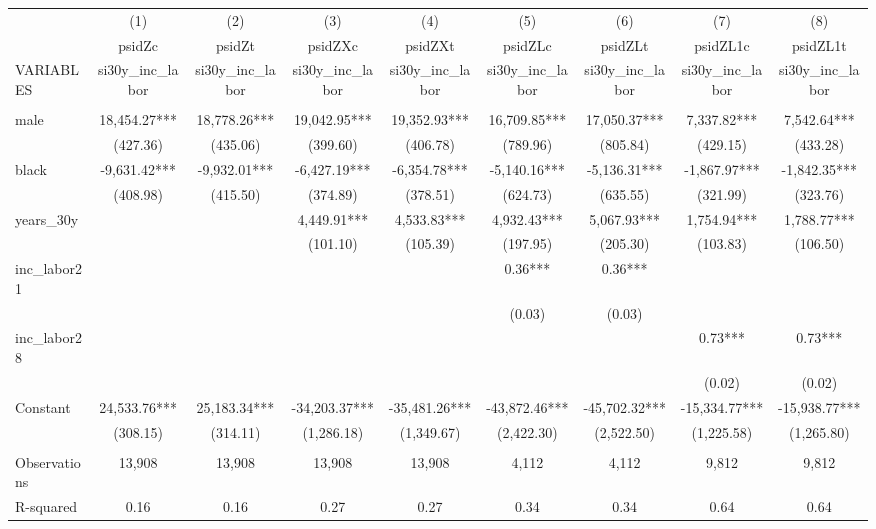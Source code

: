 \begin{tabular}{lcccccccc} \hline
 & (1) & (2) & (3) & (4) & (5) & (6) & (7) & (8) \\
 & psidZc & psidZt & psidZXc & psidZXt & psidZLc & psidZLt & psidZL1c & psidZL1t \\
VARIABLES & si30y\_inc\_labor & si30y\_inc\_labor & si30y\_inc\_labor & si30y\_inc\_labor & si30y\_inc\_labor & si30y\_inc\_labor & si30y\_inc\_labor & si30y\_inc\_labor \\ \hline
 &  &  &  &  &  &  &  &  \\
male & 18,454.27*** & 18,778.26*** & 19,042.95*** & 19,352.93*** & 16,709.85*** & 17,050.37*** & 7,337.82*** & 7,542.64*** \\
 & (427.36) & (435.06) & (399.60) & (406.78) & (789.96) & (805.84) & (429.15) & (433.28) \\
black & -9,631.42*** & -9,932.01*** & -6,427.19*** & -6,354.78*** & -5,140.16*** & -5,136.31*** & -1,867.97*** & -1,842.35*** \\
 & (408.98) & (415.50) & (374.89) & (378.51) & (624.73) & (635.55) & (321.99) & (323.76) \\
years\_30y &  &  & 4,449.91*** & 4,533.83*** & 4,932.43*** & 5,067.93*** & 1,754.94*** & 1,788.77*** \\
 &  &  & (101.10) & (105.39) & (197.95) & (205.30) & (103.83) & (106.50) \\
inc\_labor21 &  &  &  &  & 0.36*** & 0.36*** &  &  \\
 &  &  &  &  & (0.03) & (0.03) &  &  \\
inc\_labor28 &  &  &  &  &  &  & 0.73*** & 0.73*** \\
 &  &  &  &  &  &  & (0.02) & (0.02) \\
Constant & 24,533.76*** & 25,183.34*** & -34,203.37*** & -35,481.26*** & -43,872.46*** & -45,702.32*** & -15,334.77*** & -15,938.77*** \\
 & (308.15) & (314.11) & (1,286.18) & (1,349.67) & (2,422.30) & (2,522.50) & (1,225.58) & (1,265.80) \\
 &  &  &  &  &  &  &  &  \\
Observations & 13,908 & 13,908 & 13,908 & 13,908 & 4,112 & 4,112 & 9,812 & 9,812 \\
 R-squared & 0.16 & 0.16 & 0.27 & 0.27 & 0.34 & 0.34 & 0.64 & 0.64 \\ \hline
\end{tabular}
